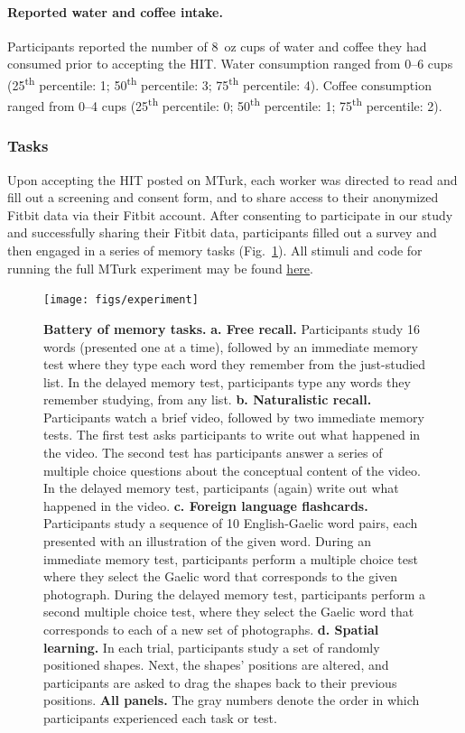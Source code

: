 \documentclass[10pt]{article}
\begin{document}
\paragraph{Reported water and coffee intake.}
Participants reported the number of 8~oz cups of water and coffee they had
consumed prior to accepting the HIT.  Water consumption ranged from
0--6 cups (25\textsuperscript{th} percentile: 1;
50\textsuperscript{th} percentile: 3; 75\textsuperscript{th}
percentile: 4).  Coffee consumption ranged from 0--4 cups (25\textsuperscript{th} percentile: 0;
50\textsuperscript{th} percentile: 1; 75\textsuperscript{th}
percentile: 2).


\subsubsection*{Tasks}
Upon accepting the HIT posted on MTurk, each worker was
directed to read and fill out a screening and consent form, and to
share access to their anonymized Fitbit data via their Fitbit account.
After consenting to participate in our study and successfully sharing their Fitbit
data, participants filled out a survey and then engaged in a series of
memory tasks (Fig.~\ref{fig:tasks}).  All stimuli and code for running
the full MTurk experiment may be found
\href{https://github.com/ContextLab/brainfit-task}{\underline{here}}.

\begin{figure}[tp]
\centering
\texttt{[image: figs/experiment]}
\caption{\textbf{Battery of memory tasks.}  \textbf{a.  Free recall.}
Participants study 16 words (presented one at a time), followed by an
immediate memory test where they type
each word they remember from the just-studied list.  In the delayed
memory test, participants type any words they remember studying, from
any list.  \textbf{b. Naturalistic recall.}  Participants watch a
brief video, followed by two immediate memory tests.  The first test
asks participants to write out what happened in the video.  The second
test has participants answer a series of multiple choice questions
about the conceptual content of the video.  In the delayed memory
test, participants (again) write out what happened in the video.
\textbf{c. Foreign language flashcards.}  Participants study a
sequence of 10 English-Gaelic word pairs, each presented with an
illustration of the given word.  During an immediate memory test,
participants perform a multiple choice test where they select the
Gaelic word that corresponds to the given photograph.  During the
delayed memory test, participants perform a second multiple choice
test, where they select the Gaelic word that corresponds to each of a
new set of photographs.  \textbf{d. Spatial learning.}  In each trial,
participants
study a set of randomly positioned shapes.  Next, the shapes'
positions are altered, and participants are asked to drag the shapes
back to their previous positions.  \textbf{All panels.}  The gray
numbers denote the order in which participants experienced each task
or test.}
\label{fig:tasks}
\end{figure}
\end{document}
